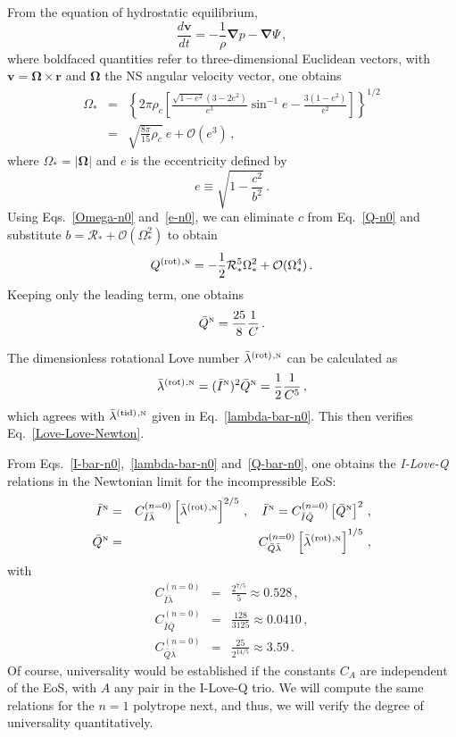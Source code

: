 \documentclass[aps,twocolumn,nofootinbib,showpacs,superscriptaddress,hyperref]{revtex4-1}
\newcommand\be{\begin{equation}}
\newcommand\ba{\begin{eqnarray}}
\newcommand\ee{\end{equation}}
\newcommand\ea{\end{eqnarray}}
\newcommand{\nn}{\nonumber}
\newcommand{\NS}{*}
\newcommand{\RNS}{\mathcal{R}_*}
\newcommand{\tid}{\mathrm{(tid)}}
\newcommand{\rot}{\mathrm{(rot)}}
\newcommand{\N}{{\mbox{\tiny N}}}
\newcommand{\Qbar}{\bar{Q}}
\begin{document}
From the equation of hydrostatic equilibrium,
%
\be
\frac{d\bm{v}}{dt} = - \frac{1}{\rho} \bm{\nabla}p - \bm{\nabla} \Psi\,,
\ee
%
where boldfaced quantities refer to three-dimensional Euclidean vectors, 
with $\bm{v} = \bm{\Omega} \times \bm{r}$ and $\bm{\Omega}$ the NS angular velocity vector, one obtains~\cite{shapiro-teukolsky}
%
\ba
\Omega_\NS &=& \left\{ 2\pi \rho_c \left[ \frac{\sqrt{1-e^2}(3-2e^2)}{e^3} \sin^{-1}e - \frac{3(1-e^2)}{e^2} \right] \right\}^{1/2} \nn \\
&=& \sqrt{\frac{8\pi}{15}\rho_c} \ e + \mathcal{O}(e^3)\,,
\label{Omega-n0}
\ea
%
where $\Omega_\NS = |\bm{\Omega}|$  and $e$ is the eccentricity defined by
%
\be
e \equiv \sqrt{1- \frac{c^2}{b^2}}\,.
\label{e-n0}
\ee
%
Using Eqs.~\eqref{Omega-n0} and~\eqref{e-n0}, we can eliminate $c$ from Eq.~\eqref{Q-n0} and substitute $b= \RNS + \mathcal{O}(\Omega_\NS^2)$ to obtain
%
\be
Q^\rot{}^{,\N} = - \frac{1}{2} \RNS^5 \Omega_\NS^2 + \mathcal{O}(\Omega_\NS^4)\,. 
\ee
%
Keeping only the leading term, one obtains~\cite{laarakkers}
%
\be
\Qbar^{\N} = \frac{25}{8} \frac{1}{C}\,.
\label{Q-bar-n0}
\ee
%

The dimensionless rotational Love number $\bar{\lambda}^\rot{}^{,\N}$ can be calculated as
%
\be
\bar{\lambda}^\rot{}^{,\N} = (\bar{I}^\N)^2 \Qbar^{\N} = \frac{1}{2} \frac{1}{C^5}\,,
\ee
%
which agrees with $\bar{\lambda}^\tid{}^{,\N}$ given in Eq.~\eqref{lambda-bar-n0}. This then verifies Eq.~\eqref{Love-Love-Newton}.

From Eqs.~\eqref{I-bar-n0},~\eqref{lambda-bar-n0} and~\eqref{Q-bar-n0}, one obtains the \emph{I-Love-Q} relations in the Newtonian limit for the incompressible EoS:
%
\ba
\bar{I}^\N &=& C_{\bar{I} \bar{\lambda}}^{(n=0)} \left[ \bar{\lambda}^\rot{}^{,\N} \right]^{2/5}\,, \quad \bar{I}^\N = C_{\bar{I} \bar{Q}}^{(n=0)} \left[ \Qbar^{\N} \right]^{2}\,, \nn \\ 
\Qbar^{\N} &=& C_{\bar{Q} \bar{\lambda}}^{(n=0)} \left[ \bar{\lambda}^\rot{}^{,\N} \right]^{1/5}\,,
\label{I-Love-Q-n0}
\ea
%
with
%
\ba
\label{coeff-I-Love-n0}
C_{\bar{I} \bar{\lambda}}^{(n=0)} &=& \frac{2^{7/5}}{5} \approx 0.528\,, \\
C_{\bar{I} \bar{Q}}^{(n=0)} &=& \frac{128}{3125} \approx 0.0410\,, \\
\label{coeff-Q-Love-n0}
C_{\bar{Q} \bar{\lambda}}^{(n=0)} &=& \frac{25}{2^{14/5}} \approx 3.59\,. 
\ea
%
Of course, universality would be established if the constants $C_{A}$ are independent of the EoS, with $A$ any pair in the I-Love-Q trio. We will compute the same relations for the $n=1$ polytrope next, and thus, we will verify the degree of universality quantitatively.  
\end{document}
